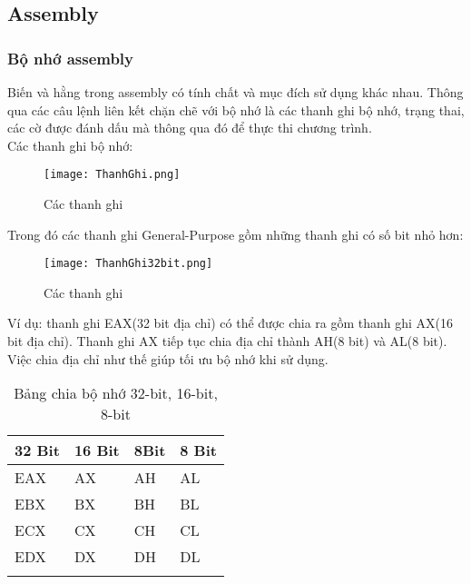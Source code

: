 	\subsection{Assembly}
	
		\subsubsection{Bộ nhớ assembly}	
		 Biến và hằng trong assembly có tính chất và mục đích sử dụng khác nhau. Thông qua các câu lệnh liên kết chặn chẽ với bộ nhớ là các thanh ghi bộ nhớ, trạng thai, các cờ được đánh dấu mà thông qua đó để thực thi chương trình.\\

		Các thanh ghi bộ nhớ:		
		\begin{center}
			\begin{figure}[htp]
				\begin{center}
					\texttt{[image: ThanhGhi.png]}
				\end{center}
				\caption{Các thanh ghi \protect\footnotemark}
				\label{fig:Flow}
			\end{figure}
		\end{center}
		
		Trong đó các thanh ghi General-Purpose gồm những thanh ghi có số bit nhỏ hơn:	
		\begin{center}
			\begin{figure}[htp]
				\begin{center}
					\texttt{[image: ThanhGhi32bit.png]}
				\end{center}
				\caption{ Các thanh ghi \protect\footnotemark}
				\label{fig:Flow}
			\end{figure}
		\end{center}
		
		Ví dụ: thanh ghi EAX(32 bit địa chỉ) có thể được chia ra gồm thanh ghi AX(16 bit địa chỉ). Thanh ghi AX tiếp tục chia địa chỉ thành AH(8 bit) và AL(8 bit). Việc chia địa chỉ như thế giúp tối ưu bộ nhớ khi sử dụng.
		\begin{longtable}{ | m{3cm} | m{3cm} | m{3cm}  | m{3cm}| }
			\hline
				32 Bit & 16 Bit & 8Bit & 8 Bit\\
			\hline
			\hline
				EAX & AX	& AH	 & AL\\
			\hline			
				EBX & BX	& BH	 & BL\\
			\hline		
				ECX & CX	& CH	 & CL\\		
			\hline
				EDX & DX	& DH	 & DL\\
			\hline
			\caption{Bảng chia bộ nhớ 32-bit, 16-bit, 8-bit}
			\label{table:tbthanhghi}
		\end{longtable}
		
